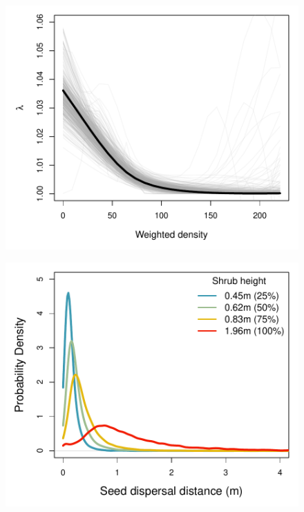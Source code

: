 \documentclass[11pt]{article}\usepackage[]{graphicx}\usepackage[usenames,dvipsnames]{xcolor}
\begin{document}
\newpage
\begin{figure}[H]
  \begin{center}
    \includegraphics[width=\linewidth]{Figures/LambdaD}
  \caption{}
  \label{fig:lambda}
  \end{center}
\end{figure}

\newpage
\begin{figure}[H]
  \begin{center}
    \includegraphics[width=\linewidth]{Figures/Dkernels}
  \caption{}
  \label{fig:dispersal}
  \end{center}
\end{figure}
\end{document}
